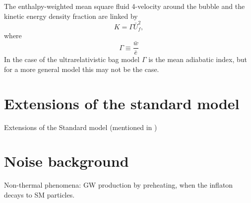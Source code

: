 The enthalpy-weighted mean square fluid 4-velocity around the bubble and the kinetic energy density fraction are linked by
\begin{equation}
K = \Gamma \bar{U}_f^2,
\end{equation}
where
\begin{equation}
\Gamma \equiv \frac{\bar{w}}{\bar{e}}
\end{equation}
In the case of the ultrarelativistic bag model $\Gamma$ is the mean adiabatic index,
but for a more general model this may not be the case.


\iffalse
Efficiency factor $\kappa$, which is the fraction of energy that is converted into fluid motion.
\begin{equation}
\kappa \equiv \frac{3}{\xi_w^3 \Delta \theta} \int d\xi \xi^2 w \gamma^2 v^2
\end{equation}
From solving the hydrodynamic equations of state of a single expanding bubble.

Kinetic energy fraction
\cites[eq. 7.36]{lecture_notes}[eq. 5]{giese_2020}
\begin{align}
K
&\equiv \frac{\rho_\text{fl}}{\bar{e}}
= \frac{1}{\mathcal{v} \bar{e}} \int d^3 x w \gamma^2 v^2,
\end{align}
where $\mathcal{v}$ is the volume we average over, and $\bar{e}$ is the mean energy density.
It should be noted that $0 < K < 1$.
\cite{giese_2020}

For a single bubble we have, using its volume and the energy density of the symmetric phase that the bubble replaces, the kinetic energy fraction
\cites[eq. 7.37]{lecture_notes}[eq. 5]{giese_2020}
\begin{equation}
K_1 = \frac{3}{\xi_w^3 e_s} \int d\xi \xi^2 w \gamma^2 v^2.
\end{equation}

The kinetic energy fraction can be determined from
\begin{itemize}
\item wall velocity $v_w$
\item the speeds of sound
\item strength parameter of the phase transition
\end{itemize}
\fi


\section{Extensions of the standard model}
Extensions of the Standard model \cite{caprini_detecting_2020}
(mentioned in \cite[p. 14]{lecture_notes})

\section{Noise background}
Non-thermal phenomena: GW production by preheating, when the inflaton decays to SM particles.
\cite{lecture_notes}
